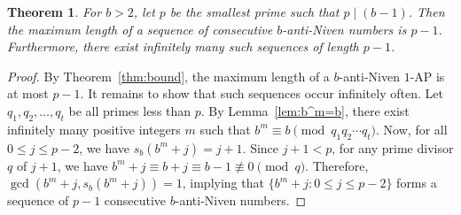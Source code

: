 \documentclass[12pt]{article}
\newtheorem{theorem}{Theorem}[section]
\theoremstyle{definition}
\begin{document}

\begin{theorem}\label{thm:b>2,1AP}
For $b>2$, let $p$ be the smallest prime such that $p\mid(b-1)$. Then the maximum length of a sequence of consecutive $b$-anti-Niven numbers is $p-1$. Furthermore, there exist infinitely many such sequences of length $p-1$.
\end{theorem}
\begin{proof}
By Theorem~\ref{thm:bound}, the maximum length of a $b$-anti-Niven $1$-AP is at most $p-1$. It remains to show that such sequences occur infinitely often. Let $q_1,q_2,\dotsc,q_t$ be all primes less than $p$. By Lemma~\ref{lem:b^m=b}, there exist infinitely many positive integers $m$ such that $b^m\equiv b\pmod{q_1q_2\dotsb q_t}$. Now, for all $0\leq j\leq p-2$, we have $s_b(b^m+j)=j+1$.  Since $j+1<p$, for any prime divisor $q$ of $j+1$, we have $b^m+j\equiv b+j\equiv b-1\not\equiv 0\pmod{q}$. Therefore, $\gcd(b^m+j,s_b(b^m+j))=1$, implying that $\{b^m+j:0\leq j\leq p-2\}$ forms a sequence of $p-1$ consecutive $b$-anti-Niven numbers.
\end{proof}
\end{document}
